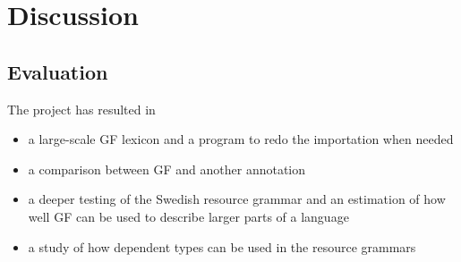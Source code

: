 \documentclass{report}
\begin{document}


\chapter{Discussion}
\label{sec:results}
\section{Evaluation}
The project has resulted in
\begin{itemize}
\item a large-scale GF lexicon and a program to redo the importation when needed
\item a comparison between GF and another annotation
\item a deeper testing of the Swedish resource grammar and an estimation
of how well GF can be used to describe larger parts of a language
\item a study of how dependent types can be used in the resource grammars
\end{itemize}
\end{document}
